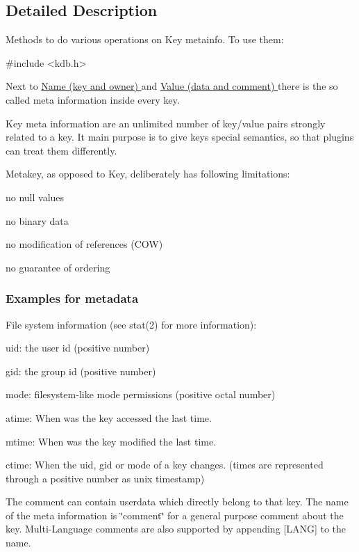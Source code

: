 \subsection{Detailed Description}
Methods to do various operations on Key metainfo. To use them\-: 
\begin{DoxyCode}
\textcolor{preprocessor}{#include <kdb.h>}
\end{DoxyCode}


Next to \hyperlink{group__keyname}{Name (key and owner) } and \hyperlink{group__keyvalue}{Value (data and comment) } there is the so called meta information inside every key.

Key meta information are an unlimited number of key/value pairs strongly related to a key. It main purpose is to give keys special semantics, so that plugins can treat them differently.

Metakey, as opposed to Key, deliberately has following limitations\-:
\begin{DoxyItemize}
\item no null values
\item no binary data
\item no modification of references (C\-O\-W)
\item no guarantee of ordering
\end{DoxyItemize}

\subsubsection*{Examples for metadata}

File system information (see stat(2) for more information)\-:
\begin{DoxyItemize}
\item uid\-: the user id (positive number)
\item gid\-: the group id (positive number)
\item mode\-: filesystem-\/like mode permissions (positive octal number)
\item atime\-: When was the key accessed the last time.
\item mtime\-: When was the key modified the last time.
\item ctime\-: When the uid, gid or mode of a key changes. (times are represented through a positive number as unix timestamp)
\end{DoxyItemize}

The comment can contain userdata which directly belong to that key. The name of the meta information is \char`\"{}comment\char`\"{} for a general purpose comment about the key. Multi-\/\-Language comments are also supported by appending \mbox{[}L\-A\-N\-G\mbox{]} to the name.

